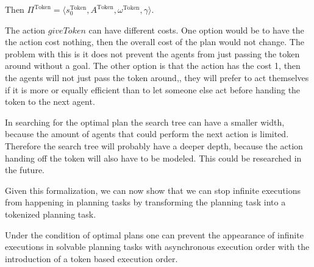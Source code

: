 Then $ \Pi^{\text{Token}} = \langle s_0^{\text{Token}}, A ^{\text{Token}}, \omega ^{\text{Token}}, \gamma \rangle $.

The action $giveToken$ can have different costs. One option would be to have the the action cost nothing, then the overall cost of the plan would not change. The problem with this is it does not prevent the agents from just passing the token around without a goal. The other option is that the action has the cost 1, then the agents will not just pass the token around,, they will prefer to act themselves if it is more or equally efficient than to let someone else act before handing the token to the next agent.

In searching for the optimal plan the search tree can have a smaller width, because the amount of agents that could perform the next action is limited. Therefore the search tree will probably have a deeper depth, because the action handing off the token will also have to be modeled. This could be researched in the future.


Given this formalization, we can now show that we can stop infinite executions from happening in planning tasks by transforming the planning task into a tokenized planning task.

\begin{theorem}
Under the condition of optimal plans one can prevent the appearance of infinite executions in solvable planning tasks with asynchronous execution order with the introduction of a token based execution order.
\end{theorem}


